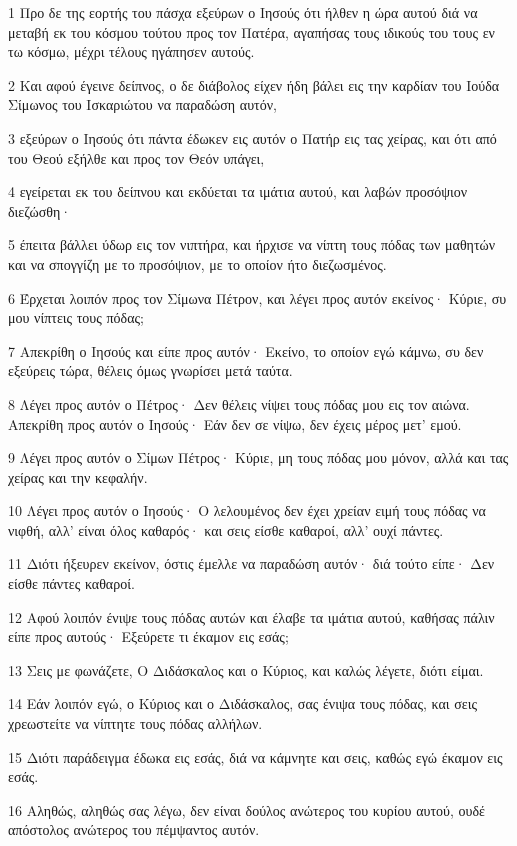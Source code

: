 \par 1 Προ δε της εορτής του πάσχα εξεύρων ο Ιησούς ότι ήλθεν η ώρα αυτού διά να μεταβή εκ του κόσμου τούτου προς τον Πατέρα, αγαπήσας τους ιδικούς του τους εν τω κόσμω, μέχρι τέλους ηγάπησεν αυτούς.
\par 2 Και αφού έγεινε δείπνος, ο δε διάβολος είχεν ήδη βάλει εις την καρδίαν του Ιούδα Σίμωνος του Ισκαριώτου να παραδώση αυτόν,
\par 3 εξεύρων ο Ιησούς ότι πάντα έδωκεν εις αυτόν ο Πατήρ εις τας χείρας, και ότι από του Θεού εξήλθε και προς τον Θεόν υπάγει,
\par 4 εγείρεται εκ του δείπνου και εκδύεται τα ιμάτια αυτού, και λαβών προσόψιον διεζώσθη·
\par 5 έπειτα βάλλει ύδωρ εις τον νιπτήρα, και ήρχισε να νίπτη τους πόδας των μαθητών και να σπογγίζη με το προσόψιον, με το οποίον ήτο διεζωσμένος.
\par 6 Έρχεται λοιπόν προς τον Σίμωνα Πέτρον, και λέγει προς αυτόν εκείνος· Κύριε, συ μου νίπτεις τους πόδας;
\par 7 Απεκρίθη ο Ιησούς και είπε προς αυτόν· Εκείνο, το οποίον εγώ κάμνω, συ δεν εξεύρεις τώρα, θέλεις όμως γνωρίσει μετά ταύτα.
\par 8 Λέγει προς αυτόν ο Πέτρος· Δεν θέλεις νίψει τους πόδας μου εις τον αιώνα. Απεκρίθη προς αυτόν ο Ιησούς· Εάν δεν σε νίψω, δεν έχεις μέρος μετ' εμού.
\par 9 Λέγει προς αυτόν ο Σίμων Πέτρος· Κύριε, μη τους πόδας μου μόνον, αλλά και τας χείρας και την κεφαλήν.
\par 10 Λέγει προς αυτόν ο Ιησούς· Ο λελουμένος δεν έχει χρείαν ειμή τους πόδας να νιφθή, αλλ' είναι όλος καθαρός· και σεις είσθε καθαροί, αλλ' ουχί πάντες.
\par 11 Διότι ήξευρεν εκείνον, όστις έμελλε να παραδώση αυτόν· διά τούτο είπε· Δεν είσθε πάντες καθαροί.
\par 12 Αφού λοιπόν ένιψε τους πόδας αυτών και έλαβε τα ιμάτια αυτού, καθήσας πάλιν είπε προς αυτούς· Εξεύρετε τι έκαμον εις εσάς;
\par 13 Σεις με φωνάζετε, Ο Διδάσκαλος και ο Κύριος, και καλώς λέγετε, διότι είμαι.
\par 14 Εάν λοιπόν εγώ, ο Κύριος και ο Διδάσκαλος, σας ένιψα τους πόδας, και σεις χρεωστείτε να νίπτητε τους πόδας αλλήλων.
\par 15 Διότι παράδειγμα έδωκα εις εσάς, διά να κάμνητε και σεις, καθώς εγώ έκαμον εις εσάς.
\par 16 Αληθώς, αληθώς σας λέγω, δεν είναι δούλος ανώτερος του κυρίου αυτού, ουδέ απόστολος ανώτερος του πέμψαντος αυτόν.

